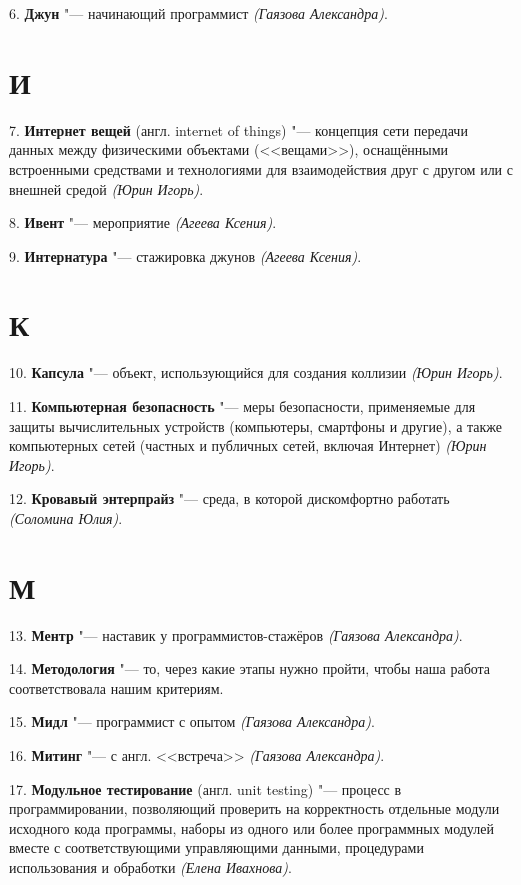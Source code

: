 \documentclass{article}
\begin{document}
6. \textbf{Джун} "--- начинающий программист \textit{(Гаязова Александра)}.

\section*{И}

\hspace{0.33cm} 7. \textbf{Интернет вещей} (англ. internet of things) "---
концепция сети передачи данных между физическими объектами (<<вещами>>),
оснащёнными встроенными средствами и технологиями для взаимодействия друг с
другом или с внешней средой \textit{(Юрин Игорь)}.

8. \textbf{Ивент} "--- мероприятие \textit{(Агеева Ксения)}.

9. \textbf{Интернатура} "--- стажировка джунов \textit{(Агеева Ксения)}.

\section*{К}

\hspace{0.37cm} 10. \textbf{Капсула} "--- объект, использующийся для создания коллизии
\textit{(Юрин Игорь)}.

11. \textbf{Компьютерная безопасность} "--- меры безопасности, применяемые для
защиты вычислительных устройств (компьютеры, смартфоны и другие), а также
компьютерных сетей (частных и публичных сетей, включая Интернет) \textit{(Юрин
Игорь)}.
 

12. \textbf{Кровавый энтерпрайз} "--- среда, в которой дискомфортно работать
\textit{(Соломина Юлия)}.

\section*{М}

\hspace{0.42cm} 13. \textbf{Ментр} "--- наставик у программистов-стажёров \textit{(Гаязова
Александра)}.

14. \textbf{Методология} "--- то, через какие этапы нужно пройти, чтобы наша работа
соответствовала нашим критериям.

15. \textbf{Мидл} "--- программист с опытом \textit{(Гаязова Александра)}.

16. \textbf{Митинг} "--- с англ. <<встреча>> \textit{(Гаязова Александра)}.

17. \textbf{Модульное тестирование} (англ. unit testing) "--- процесс в
программировании, позволяющий проверить на корректность отдельные модули
исходного кода программы, наборы из одного или более программных модулей вместе
с соответствующими управляющими данными, процедурами использования и обработки
\textit{(Елена Ивахнова)}.
\end{document}
